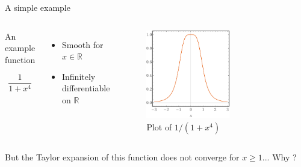 \documentclass[xcolor=x11names,compress]{beamer}
\renewcommand{\(}{\begin{columns}}
\renewcommand{\)}{\end{columns}}
\newcommand{\<}[1]{\begin{column}{#1}}
\renewcommand{\>}{\end{column}}
\begin{document}
\begin{frame}{A simple example}

\begin{columns}


\begin{beamerboxesrounded}[scheme=foncé]{An example function}

\begin{equation*}
   \frac{1}{1 + x^4}
\end{equation*}

\end{beamerboxesrounded}

\vspace{1cm}

\begin{itemize}
    \item Smooth for $x \in \mathbb{R}$
    
    \item Infinitely differentiable on $\mathbb{R}$
\end{itemize}


    \begin{figure}
    \centering
    \includegraphics[width=0.6\textwidth]{exemplesingu.pdf}
    \caption{Plot of $1/(1+x^4)$}
    \label{fig:my_label}
\end{figure}

\end{columns}

But the Taylor expansion of this function does not converge for $x\geq1$... 
\vspace{0.3cm}
\centering Why ?

\end{frame}
\end{document}
